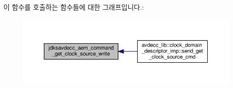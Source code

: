 이 함수를 호출하는 함수들에 대한 그래프입니다.\+:
\nopagebreak
\begin{figure}[H]
\begin{center}
\leavevmode
\includegraphics[width=350pt]{group__command__get__clock__source_gaf2e974459cddac4914a26fa862fcddc1_icgraph}
\end{center}
\end{figure}


